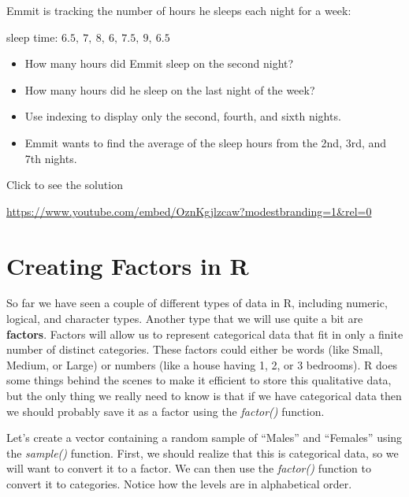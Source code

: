 \documentclass[
  letterpaper,
  DIV=11,
  numbers=noendperiod]{scrreprt}
\providecommand{\tightlist}{%
  \setlength{\itemsep}{0pt}\setlength{\parskip}{0pt}}
\begin{document}
\begin{tcolorbox}[enhanced jigsaw, colbacktitle=quarto-callout-tip-color!10!white, breakable, bottomrule=.15mm, colframe=quarto-callout-tip-color-frame, left=2mm, opacitybacktitle=0.6, title=\textcolor{quarto-callout-tip-color}{\faLightbulb}\hspace{0.5em}{Try it Out}, leftrule=.75mm, opacityback=0, rightrule=.15mm, titlerule=0mm, bottomtitle=1mm, colback=white, toprule=.15mm, arc=.35mm, toptitle=1mm, coltitle=black]

Emmit is tracking the number of hours he sleeps each night for a week:

sleep time: \(6.5,\ 7,\ 8,\ 6,\ 7.5,\ 9,\ 6.5\)

\begin{itemize}
\tightlist
\item
  How many hours did Emmit sleep on the second night?
\item
  How many hours did he sleep on the last night of the week?
\item
  Use indexing to display only the second, fourth, and sixth nights.
\item
  Emmit wants to find the average of the sleep hours from the 2nd, 3rd,
  and 7th nights.
\end{itemize}

Click to see the solution

\url{https://www.youtube.com/embed/OznKgjlzcaw?modestbranding=1&rel=0}

\end{tcolorbox}

\section{Creating Factors in R}\label{creating-factors-in-r}

So far we have seen a couple of different types of data in R, including
numeric, logical, and character types. Another type that we will use
quite a bit are \textbf{factors}. Factors will allow us to represent
categorical data that fit in only a finite number of distinct
categories. These factors could either be words (like Small, Medium, or
Large) or numbers (like a house having 1, 2, or 3 bedrooms). R does some
things behind the scenes to make it efficient to store this qualitative
data, but the only thing we really need to know is that if we have
categorical data then we should probably save it as a factor using the
\emph{factor()} function.

Let's create a vector containing a random sample of ``Males'' and
``Females'' using the \emph{sample()} function. First, we should realize
that this is categorical data, so we will want to convert it to a
factor. We can then use the \emph{factor()} function to convert it to
categories. Notice how the levels are in alphabetical order.
\end{document}
